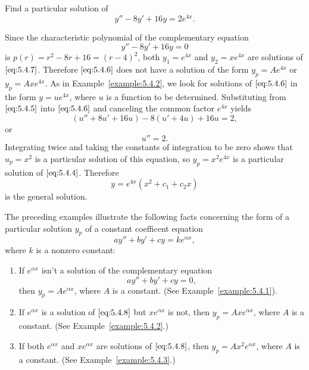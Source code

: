 \documentclass{ximera}
\begin{document}
\begin{example}\label{example:5.4.3}
Find a particular solution of
\begin{equation} \label{eq:5.4.6}
y''-8y'+16y=2e^{4x}.
\end{equation}
 
\begin{explanation}
Since the characteristic polynomial of the complementary equation
\begin{equation} \label{eq:5.4.7}
y''-8y'+16y=0
\end{equation}
is $p(r)=r^2-8r+16=(r-4)^2$, both $y_1=e^{4x}$ and $y_2=xe^{4x}$ are
solutions of $\eqref{eq:5.4.7}$. Therefore $\eqref{eq:5.4.6}$ does not have a
solution of the form $y_p=Ae^{4x}$ or $y_p=Axe^{4x}$. As in
Example~\ref{example:5.4.2}, we look for solutions of $\eqref{eq:5.4.6}$ in the
form $y=ue^{4x}$, where $u$ is a function to be determined.
Substituting from $\eqref{eq:5.4.5}$ into $\eqref{eq:5.4.6}$ and canceling the
common factor $e^{4x}$ yields
$$
(u''+8u'+16u)-8(u'+4u)+16u=2,
$$
or
$$
u''=2.
$$
Integrating twice and taking the constants of integration to be zero
shows that $u_p=x^2$ is a particular solution of this equation, so
$y_p=x^2e^{4x}$ is a particular solution of $\eqref{eq:5.4.4}$. Therefore
$$
y=e^{4x}(x^2+c_1+c_2x)
$$
is the general solution.
\end{explanation}
\end{example}
 
The preceding examples illustrate the following facts concerning
the form of a particular solution $y_p$
of a constant coefficent equation
$$
ay''+by'+cy=ke^{\alpha x},
$$
where $k$ is a nonzero constant:
 
\begin{enumerate}
\item\label{item:ypa} %
If $e^{\alpha x}$ isn't  a solution of the complementary
equation
\begin{equation} \label{eq:5.4.8}
ay''+by'+cy=0,
\end{equation}
then  $y_p=Ae^{\alpha x}$, where $A$ is a constant. (See
Example~\ref{example:5.4.1}).
\item \label{item:ypb} %
If $e^{\alpha x}$ is a solution of $\eqref{eq:5.4.8}$ but $xe^{\alpha x}$
is not, then  $y_p=Axe^{\alpha x}$,  where $A$ is a constant.
(See Example~\ref{example:5.4.2}.)
\item \label{item:ypc}%
If both $e^{\alpha x}$ and $xe^{\alpha x}$ are solutions of $\eqref{eq:5.4.8}$,
then  $y_p=Ax^2e^{\alpha x}$,  where $A$ is a constant.
(See Example~\ref{example:5.4.3}.)
\end{enumerate}
 
\end{document}
